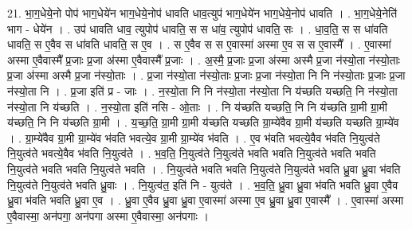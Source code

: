 \documentclass[17pt]{extarticle}
\begin{document}
21. भा॒ग॒धेये॒नो पोप॑ भाग॒धेये॑न भाग॒धेये॒नोप॑ धावति धाव॒त्युप॑ भाग॒धेये॑न भाग॒धेये॒नोप॑ धावति । . भा॒ग॒धेये॒नेति॑ भाग - धेये॑न । . उप॑ धावति धाव॒ त्युपोप॑ धावति॒ स स धा॑व॒ त्युपोप॑ धावति॒ सः । . धा॒व॒ति॒ स स धा॑वति धावति॒ स ए॒वैव स धा॑वति धावति॒ स ए॒व । . स ए॒वैव स स ए॒वास्मा॑ अस्मा ए॒व स स ए॒वास्मै᳚ । . ए॒वास्मा॑ अस्मा ए॒वैवास्मै᳚ प्र॒जाः प्र॒जा अ॑स्मा ए॒वैवास्मै᳚ प्र॒जाः । . अ॒स्मै॒ प्र॒जाः प्र॒जा अ॑स्मा अस्मै प्र॒जा न॑स्यो॒ता न॑स्यो॒ताः प्र॒जा अ॑स्मा अस्मै प्र॒जा न॑स्यो॒ताः । . प्र॒जा न॑स्यो॒ता न॑स्यो॒ताः प्र॒जाः प्र॒जा न॑स्यो॒ता नि नि न॑स्यो॒ताः प्र॒जाः प्र॒जा न॑स्यो॒ता नि । . प्र॒जा इति॑ प्र - जाः । . न॒स्यो॒ता नि नि न॑स्यो॒ता न॑स्यो॒ता नि य॑च्छति यच्छति॒ नि न॑स्यो॒ता न॑स्यो॒ता नि य॑च्छति । . न॒स्यो॒ता इति॑ नसि - ओ॒ताः । . नि य॑च्छति यच्छति॒ नि नि य॑च्छति ग्रा॒मी ग्रा॒मी य॑च्छति॒ नि नि य॑च्छति ग्रा॒मी । . य॒च्छ॒ति॒ ग्रा॒मी ग्रा॒मी य॑च्छति यच्छति ग्रा॒म्ये॑वैव ग्रा॒मी य॑च्छति यच्छति ग्रा॒म्ये॑व । . ग्रा॒म्ये॑वैव ग्रा॒मी ग्रा॒म्ये॑व भ॑वति भवत्ये॒व ग्रा॒मी ग्रा॒म्ये॑व भ॑वति । . ए॒व भ॑वति भवत्ये॒वैव भ॑वति नि॒युत्व॑ते नि॒युत्व॑ते भवत्ये॒वैव भ॑वति नि॒युत्व॑ते । . भ॒व॒ति॒ नि॒युत्व॑ते नि॒युत्व॑ते भवति भवति नि॒युत्व॑ते भवति भवति नि॒युत्व॑ते भवति भवति नि॒युत्व॑ते भवति । . नि॒युत्व॑ते भवति भवति नि॒युत्व॑ते नि॒युत्व॑ते भवति ध्रु॒वा ध्रु॒वा भ॑वति नि॒युत्व॑ते नि॒युत्व॑ते भवति ध्रु॒वाः । . नि॒युत्व॑त॒ इति॑ नि - युत्व॑ते । . भ॒व॒ति॒ ध्रु॒वा ध्रु॒वा भ॑वति भवति ध्रु॒वा ए॒वैव ध्रु॒वा भ॑वति भवति ध्रु॒वा ए॒व । . ध्रु॒वा ए॒वैव ध्रु॒वा ध्रु॒वा ए॒वास्मा॑ अस्मा ए॒व ध्रु॒वा ध्रु॒वा ए॒वास्मै᳚ । . ए॒वास्मा॑ अस्मा ए॒वैवास्मा॒ अन॑पगा॒ अन॑पगा अस्मा ए॒वैवास्मा॒ अन॑पगाः । \newline
\end{document}
